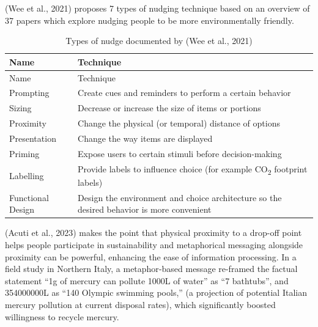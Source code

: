 \documentclass[
  12pt,
  letterpaper,
  DIV=11,
  numbers=noendperiod]{scrartcl}
\begin{document}
(Wee et al., 2021) proposes 7 types of nudging technique based on an
overview of 37 papers which explore nudging people to be more
environmentally friendly.

\def\pandoctableshortcapt{Types of Nudge}

\begin{longtable}[]{@{}
  >{\raggedright\arraybackslash}p{}
  >{\raggedright\arraybackslash}p{}@{}}
\caption[Types of Nudge]{Types of nudge documented by (Wee et al.,
2021)}\tabularnewline
\toprule\noalign{}
\begin{minipage}[b]{\linewidth}\raggedright
Name
\end{minipage} & \begin{minipage}[b]{\linewidth}\raggedright
Technique
\end{minipage} \\
\midrule\noalign{}
\endfirsthead
\toprule\noalign{}
\begin{minipage}[b]{\linewidth}\raggedright
Name
\end{minipage} & \begin{minipage}[b]{\linewidth}\raggedright
Technique
\end{minipage} \\
\midrule\noalign{}
\endhead
\bottomrule\noalign{}
\endlastfoot
Prompting & Create cues and reminders to perform a certain behavior \\
Sizing & Decrease or increase the size of items or portions \\
Proximity & Change the physical (or temporal) distance of options \\
Presentation & Change the way items are displayed \\
Priming & Expose users to certain stimuli before decision-making \\
Labelling & Provide labels to influence choice (for example
CO\textsubscript{2} footprint labels) \\
Functional Design & Design the environment and choice architecture so
the desired behavior is more convenient \\
\end{longtable}

\let\pandoctableshortcapt\relax

(Acuti et al., 2023) makes the point that physical proximity to a
drop-off point helps people participate in sustainability and
metaphorical messaging alongside proximity can be powerful, enhancing
the ease of information processing. In a field study in Northern Italy,
a metaphor‐based message re-framed the factual statement ``1g of mercury
can pollute 1000L of water'' as ``7 bathtubs'', and 354000000L as ``140
Olympic swimming pools,'' (a projection of potential Italian mercury
pollution at current disposal rates), which significantly boosted
willingness to recycle mercury.
\end{document}

